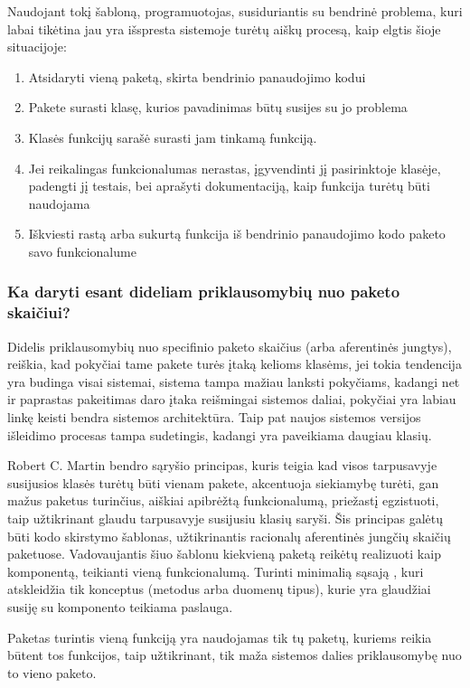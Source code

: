 Naudojant tokį šabloną, programuotojas, susiduriantis su bendrinė problema, kuri labai tikėtina jau yra išspresta sistemoje turėtų
aiškų procesą, kaip elgtis šioje situacijoje:
\begin{enumerate}
    \item Atsidaryti vieną paketą, skirta bendrinio panaudojimo kodui
    \item Pakete surasti klasę, kurios pavadinimas būtų susijes su jo problema
    \item Klasės funkcijų sarašė surasti jam tinkamą funkciją.
    \item Jei reikalingas funkcionalumas nerastas, įgyvendinti jį pasirinktoje klasėje, padengti jį testais,
    bei aprašyti dokumentaciją, kaip funkcija turėtų būti naudojama
    \item Iškviesti rastą arba sukurtą funkcija iš bendrinio panaudojimo kodo paketo savo funkcionalume
\end{enumerate}

\subsubsection{Ka daryti esant dideliam priklausomybių nuo paketo skaičiui?}
Didelis priklausomybių nuo specifinio paketo skaičius (arba aferentinės jungtys), reiškia, kad pokyčiai tame pakete turės įtaką kelioms klasėms,
jei tokia tendencija yra budinga visai sistemai, sistema tampa mažiau lanksti pokyčiams, kadangi net ir paprastas pakeitimas
daro įtaka reišmingai sistemos daliai, pokyčiai yra labiau linkę keisti bendra sistemos architektūra.
Taip pat naujos sistemos versijos išleidimo  procesas tampa sudetingis, kadangi yra paveikiama daugiau klasių.

Robert C. Martin bendro sąryšio principas, kuris teigia kad visos tarpusavyje susijusios klasės turėtų būti vienam pakete,
akcentuoja siekiamybę turėti, gan mažus paketus turinčius, aiškiai apibrėžtą funkcionalumą, priežastį egzistuoti, taip užtikrinant
glaudu tarpusavyje susijusiu klasių saryši.
Šis principas galėtų būti kodo skirstymo šablonas, užtikrinantis racionalų aferentinės jungčių skaičių paketuose.
Vadovaujantis šiuo šablonu kiekvieną paketą reikėtų realizuoti kaip komponentą, teikianti vieną funkcionalumą.
Turinti minimalią sąsają , kuri atskleidžia tik konceptus (metodus arba duomenų tipus),
kurie yra glaudžiai susiję su komponento teikiama paslauga.

Paketas turintis vieną funkciją yra naudojamas tik tų paketų, kuriems reikia būtent tos funkcijos,
taip užtikrinant, tik maža sistemos dalies priklausomybę nuo to vieno paketo.

